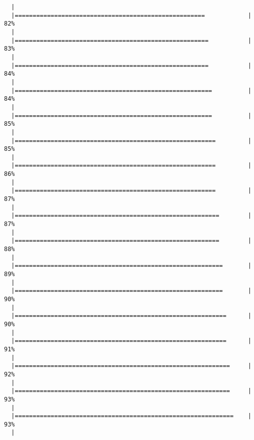 \begin{knitrout}
\begin{kframe}
\begin{verbatim}
  |                                                                       
  |=====================================================            |  82%
  |                                                                       
  |======================================================           |  83%
  |                                                                       
  |======================================================           |  84%
  |                                                                       
  |=======================================================          |  84%
  |                                                                       
  |=======================================================          |  85%
  |                                                                       
  |========================================================         |  85%
  |                                                                       
  |========================================================         |  86%
  |                                                                       
  |========================================================         |  87%
  |                                                                       
  |=========================================================        |  87%
  |                                                                       
  |=========================================================        |  88%
  |                                                                       
  |==========================================================       |  89%
  |                                                                       
  |==========================================================       |  90%
  |                                                                       
  |===========================================================      |  90%
  |                                                                       
  |===========================================================      |  91%
  |                                                                       
  |============================================================     |  92%
  |                                                                       
  |============================================================     |  93%
  |                                                                       
  |=============================================================    |  93%
  |                                                                       

\end{verbatim}
\end{kframe}
\end{knitrout}
